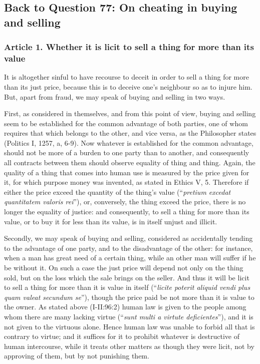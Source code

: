     \subsection*{Back to Question 77: On cheating in buying and selling}

        \subsubsection{Article 1. Whether it is licit to sell a thing for more than its value}

            It is altogether sinful to have recourse to deceit in order to sell a thing for more than its just price, because this is to deceive one's neighbour so as to injure him. But, apart from fraud, we may speak of buying and selling in two ways.

            First, as considered in themselves, and from this point of view, buying and selling seem to be established for the common advantage of both parties, one of whom requires that which belongs to the other, and vice versa, as the Philosopher states (Politics I, 1257, a, 6-9). Now whatever is established for the common advantage, should not be more of a burden to one party than to another, and consequently all contracts between them should observe equality of thing and thing. 
            Again, the quality of a thing that comes into human use is measured by the price given for it, for which purpose money was invented, as stated in Ethics V, 5. Therefore if either the price exceed the quantity of the thing’s value (``\textit{pretium excedat quantitatem valoris rei}''), or, conversely, the thing exceed the price, there is no longer the equality of justice: and consequently, to sell a thing for more than its value, or to buy it for less than its value, is in itself unjust and illicit.

            Secondly, we may speak of buying and selling, considered as accidentally tending to the advantage of one party, and to the disadvantage of the other: for instance, when a man has great need of a certain thing, while an other man will suffer if he be without it. On such a case the just price will depend not only on the thing sold, but on the loss which the sale brings on the seller. And thus it will be licit to sell a thing for more than it is value in itself (``\textit{licite poterit aliquid vendi plus quam valeat secundum se}''), though the price paid be not more than it is value to the owner.
            As stated above (I-II:96:2) human law is given to the people among whom there are many lacking virtue (``\textit{sunt multi a virtute deficientes}''), and it is not given to the virtuous alone. Hence human law was unable to forbid all that is contrary to virtue; and it suffices for it to prohibit whatever is destructive of human intercourse, while it treats other matters as though they were licit, not by approving of them, but by not punishing them.

